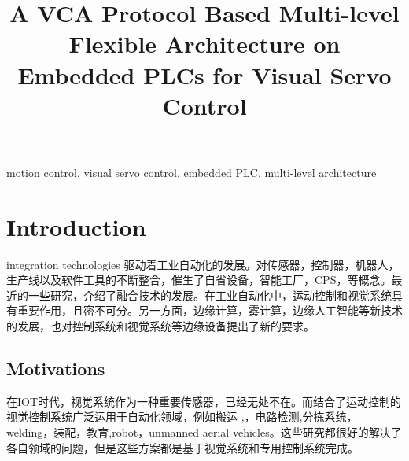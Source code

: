 \documentclass[journal,UTF8]{IEEEtran}
\begin{document}
%
\title{A VCA Protocol Based Multi-level Flexible Architecture on Embedded PLCs for Visual Servo Control }

\maketitle


\begin{abstract}

\end{abstract}

\begin{IEEEkeywords}
motion control, visual servo control, embedded PLC, multi-level architecture
\end{IEEEkeywords}

%
\IEEEpeerreviewmaketitle



\section{Introduction}
integration technologies 驱动着工业自动化的发展\cite{Kazmierkowski2007Integration}。对传感器，控制器，机器人，生产线以及软件工具的不断整合，催生了自省设备，智能工厂，CPS，等概念\cite{Wan2018An,Chekired2018Industrial}。最近的一些研究，\cite{Colombo2006An,Vaccaro2010An,Dean2017Integration}介绍了融合技术的发展。在工业自动化中，运动控制和视觉系统具有重要作用，且密不可分\cite{Feng2002Integrating,Chang2006Motion,Feng2005Practical}。另一方面，边缘计算，雾计算，边缘人工智能等新技术的发展\cite{Hu2017Fog,Hou2018Green,PaceAn}，也对控制系统和视觉系统等边缘设备提出了新的要求。

\subsection{Motivations}
在IOT时代，视觉系统作为一种重要传感器，已经无处不在。而结合了运动控制的视觉控制系统广泛运用于自动化领域，例如搬运 \cite{Xing2014Intersection},，电路检测\cite{Nian2005An},分拣系统，welding\cite{Chen2014A}，装配\cite{Wang2008Visual,Xiao2014Visual}，教育,robot\cite{Wu2013Cloud,Tsai2017A}，unmanned aerial vehicles\cite{Guenard2010A,Serra2016Landing}。这些研究都很好的解决了各自领域的问题，但是这些方案都是基于视觉系统和专用控制系统完成。
\end{document}
